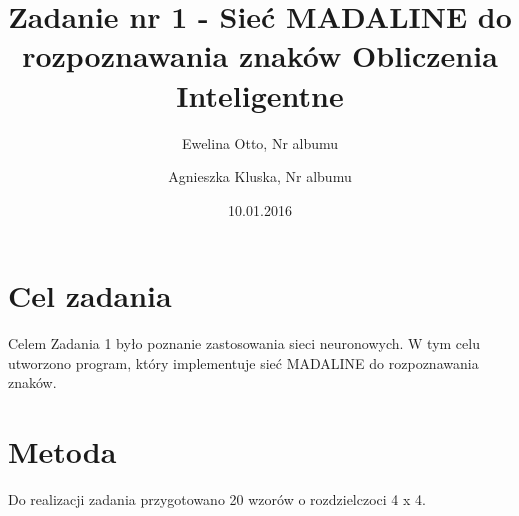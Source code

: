 \documentclass[12pt]{article}
\title{{\bf Zadanie nr 1 - Sieć MADALINE do rozpoznawania znaków}\linebreak
Obliczenia Inteligentne}
\author{Ewelina Otto, Nr albumu \and Agnieszka Kluska, Nr albumu}
\date{10.01.2016}
\begin{document}
\clearpage\maketitle
\thispagestyle{empty}
\newpage
\setcounter{page}{1}
\section{Cel zadania}
Celem Zadania 1 było poznanie zastosowania sieci neuronowych. W tym celu utworzono program, który implementuje sieć MADALINE do rozpoznawania znaków. 

\section{Metoda}
Do realizacji zadania przygotowano 20 wzorów o rozdzielczoci 4 x 4. 
\end{document}
